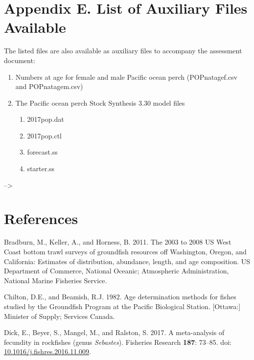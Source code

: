 \documentclass[12pt,]{article}
\begin{document}
\FloatBarrier

\section{Appendix E. List of Auxiliary Files
Available}\label{appendix-e.-list-of-auxiliary-files-available}

The listed files are also available as auxiliary files to accompany the
assessment document:

\begin{enumerate}
  \item Numbers at age for female and male Pacific ocean perch (POPnatagef.csv and POPnatagem.csv)
  \item The Pacific ocean perch Stock Synthesis 3.30 model files
  
  \begin{enumerate}
    \item 2017pop.dat
    \item 2017pop.ctl
    \item forecast.ss
    \item starter.ss
  \end{enumerate}
\end{enumerate}

\newpage

--\textgreater{} \color{black}

\section{References}\label{references}

\renewcommand{\thepage}{}

\hypertarget{refs}{}
\hypertarget{ref-bradburn_2003_2011}{}
Bradburn, M., Keller, A., and Horness, B. 2011. The 2003 to 2008 US West
Coast bottom trawl surveys of groundfish resources off Washington,
Oregon, and California: Estimates of distribution, abundance, length,
and age composition. US Department of Commerce, National Oceanic;
Atmospheric Administration, National Marine Fisheries Service.

\hypertarget{ref-chilton_age_1982}{}
Chilton, D.E., and Beamish, R.J. 1982. Age determination methods for
fishes studied by the Groundfish Program at the Pacific Biological
Station. {[}Ottawa:{]} Minister of Supply; Services Canada.

\hypertarget{ref-dick_meta-analysis_2017}{}
Dick, E., Beyer, S., Mangel, M., and Ralston, S. 2017. A meta-analysis
of fecundity in rockfishes (genus \emph{Sebastes}). Fisheries Research
\textbf{187}: 73--85. doi:
\href{https://doi.org/10.1016/j.fishres.2016.11.009}{10.1016/j.fishres.2016.11.009}.
\end{document}
